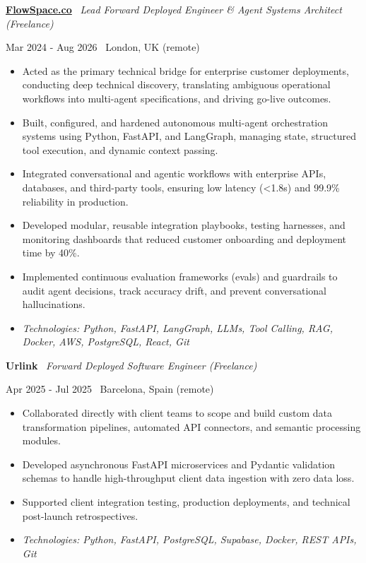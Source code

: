 \documentclass[a4paper,10pt]{article}
\newcommand{\role}[4]{%
  \vspace{2pt}\noindent
  \begin{minipage}[t]{0.70\textwidth}\raggedright\textbf{#1} \textbullet\ \textit{#3}\end{minipage}%
  \hfill
  \begin{minipage}[t]{0.28\textwidth}\raggedleft\footnotesize\color{gray}#2 \textbullet\ #4\end{minipage}%
  \vspace{1pt}%
}
\begin{document}
\role{\href{https://flowspace.co}{FlowSpace.co}}{Mar 2024 - Aug 2026}{Lead Forward Deployed Engineer \& Agent Systems Architect (Freelance)}{London, UK (remote)}
\begin{itemize}
  \item Acted as the primary technical bridge for enterprise customer deployments, conducting deep technical discovery, translating ambiguous operational workflows into multi-agent specifications, and driving go-live outcomes.
  \item Built, configured, and hardened autonomous multi-agent orchestration systems using Python, FastAPI, and LangGraph, managing state, structured tool execution, and dynamic context passing.
  \item Integrated conversational and agentic workflows with enterprise APIs, databases, and third-party tools, ensuring low latency (<1.8s) and 99.9\% reliability in production.
  \item Developed modular, reusable integration playbooks, testing harnesses, and monitoring dashboards that reduced customer onboarding and deployment time by 40\%.
  \item Implemented continuous evaluation frameworks (evals) and guardrails to audit agent decisions, track accuracy drift, and prevent conversational hallucinations.
  \item \textit{Technologies: Python, FastAPI, LangGraph, LLMs, Tool Calling, RAG, Docker, AWS, PostgreSQL, React, Git}
\end{itemize}

\role{Urlink}{Apr 2025 - Jul 2025}{Forward Deployed Software Engineer (Freelance)}{Barcelona, Spain (remote)}
\begin{itemize}
  \item Collaborated directly with client teams to scope and build custom data transformation pipelines, automated API connectors, and semantic processing modules.
  \item Developed asynchronous FastAPI microservices and Pydantic validation schemas to handle high-throughput client data ingestion with zero data loss.
  \item Supported client integration testing, production deployments, and technical post-launch retrospectives.
  \item \textit{Technologies: Python, FastAPI, PostgreSQL, Supabase, Docker, REST APIs, Git}
\end{itemize}
\end{document}
